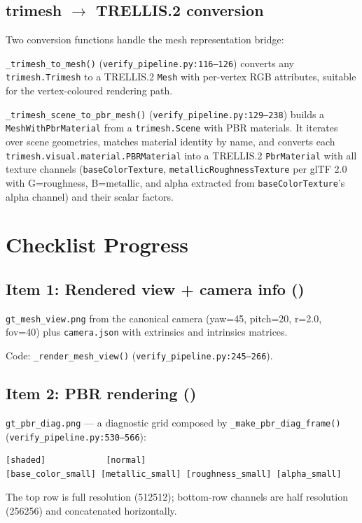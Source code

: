 \subsection{trimesh $\to$ TRELLIS.2 conversion}

Two conversion functions handle the mesh representation bridge:

\texttt{\_trimesh\_to\_mesh()} (\texttt{verify\_pipeline.py:116--126})
converts any \texttt{trimesh.Trimesh} to a TRELLIS.2 \texttt{Mesh} with
per-vertex RGB attributes, suitable for the vertex-coloured rendering path.

\texttt{\_trimesh\_scene\_to\_pbr\_mesh()} (\texttt{verify\_pipeline.py:129--238})
builds a \texttt{MeshWithPbrMaterial} from a \texttt{trimesh.Scene} with
PBR materials. It iterates over scene geometries, matches material identity
by name, and converts each \texttt{trimesh.visual.material.PBRMaterial}
into a TRELLIS.2 \texttt{PbrMaterial} with all texture channels
(\texttt{baseColorTexture}, \texttt{metallicRoughnessTexture} per glTF 2.0
with G=roughness, B=metallic, and alpha extracted from
\texttt{baseColorTexture}'s alpha channel) and their scalar factors.

\section{Checklist Progress}

\subsection{Item 1: Rendered view + camera info (\checkmark)}

\texttt{gt\_mesh\_view.png} from the canonical camera (yaw=45\degree,
pitch=20\degree, r=2.0, fov=40\degree) plus \texttt{camera.json} with
extrinsics and intrinsics matrices.

Code: \texttt{\_render\_mesh\_view()} (\texttt{verify\_pipeline.py:245--266}).

\subsection{Item 2: PBR rendering (\checkmark)}

\texttt{gt\_pbr\_diag.png} --- a diagnostic grid composed by
\texttt{\_make\_pbr\_diag\_frame()} (\texttt{verify\_pipeline.py:530--566}):
\begin{lstlisting}
[shaded]            [normal]
[base_color_small] [metallic_small] [roughness_small] [alpha_small]
\end{lstlisting}
The top row is full resolution (512\texttimes{}512); bottom-row channels are
half resolution (256\texttimes{}256) and concatenated horizontally.

